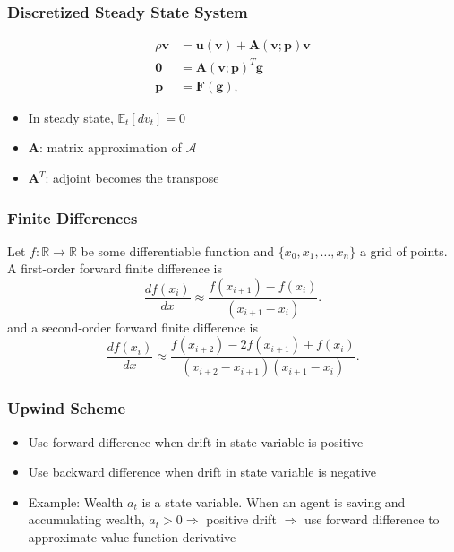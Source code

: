 \documentclass{beamer}
\newcommand{\bfg}{\mathbf{g}}
\newcommand{\bfp}{\mathbf{p}}
\newcommand{\bfu}{\mathbf{u}}
\newcommand{\bfv}{\mathbf{v}}
\newcommand{\bfA}{\mathbf{A}}
\newcommand{\bfF}{\mathbf{F}}
\newcommand{\bfzero}{\mathbf{0}}
\newcommand{\E}{\mathbb{E}}
\newcommand{\calA}{\mathcal{A}}
\newcommand{\ra}{\rightarrow}
\begin{document}
\begin{frame}
\frametitle{Discretized Steady State System}
\begin{equation}\label{eq:steady state system}
  \begin{split}
    \rho \bfv & = \bfu(\bfv) + \bfA(\bfv;\bfp)\bfv\\
    \bfzero & = \bfA(\bfv;\bfp)^T\bfg\\
    \bfp & = \bfF(\bfg),
\end{split}
\end{equation}
\begin{itemize}
\item In steady state, $\E_t[dv_t] = 0$
\item $\bfA$: matrix approximation of $\calA$
\item $\bfA^T$: adjoint becomes the transpose
\end{itemize}
\end{frame}
\begin{frame}
  \frametitle{Finite Differences}
Let $f:\mathbb{R}\ra\mathbb{R}$ be some differentiable function and $\{x_0,x_1,\dots, x_n\}$ a grid of points. A first-order forward finite difference is
\begin{equation}
\label{eq:ex first order finite difference}
  \dfrac{d f(x_i)}{d x} \approx \dfrac{f(x_{i+1}) - f(x_i)}{(x_{i+1} - x_i)}.
\end{equation}
and a second-order forward finite difference is
\begin{equation}
\label{eq:ex second order finite difference}
  \dfrac{d f(x_i)}{d x} \approx \dfrac{f(x_{i+2}) - 2f(x_{i+1}) + f(x_i)}{(x_{i+2} - x_{i+1})(x_{i+1} - x_i)}.
\end{equation}

\end{frame}
\begin{frame}
\frametitle{Upwind Scheme}
  \begin{itemize}
  \item Use forward difference when drift in state variable is positive
  \item Use backward difference when drift in state variable is negative
  \item Example: Wealth $a_t$ is a state variable. When an agent is saving and accumulating wealth, $\dot{a}_t >0\Rightarrow$ positive drift $\Rightarrow$ use forward difference to approximate value function derivative
  \end{itemize}
  \end{frame}
\end{document}

